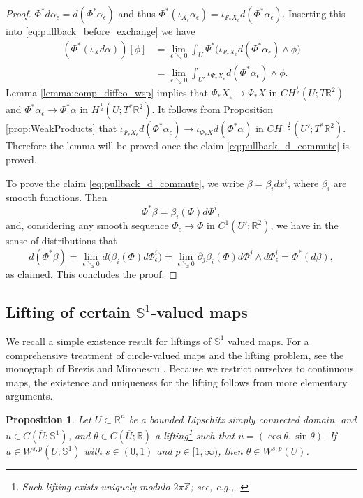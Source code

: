 \documentclass[12pt]{article}
\newcommand{\R}{\mathbb{R}}
\theoremstyle{plain}
\newtheorem{proposition}[theorem]{Proposition}
\numberwithin{equation}{section}
\begin{document}
\begin{proof}
        $\Phi^* d\alpha_\epsilon = d(\Phi^*\alpha_\epsilon)$ and thus $\Phi^*(\iota_{X_\epsilon} \alpha_\epsilon) = \iota_{\Psi_*X_\epsilon} d(\Phi^*\alpha_\epsilon)$. Inserting this into \eqref{eq:pullback_before_exchange} we have
        \begin{align*}
            (\Phi^*(\iota_X d\alpha))[\phi] &= \lim_{\epsilon \searrow 0} \int_U \Psi^* \big( \iota_{\Psi_*X_\epsilon}d(\Phi^*\alpha_\epsilon) \wedge \phi\big)\\
            &= \lim_{\epsilon \searrow 0} \int_{U'} \iota_{\Psi_*X_\epsilon}d(\Phi^*\alpha_\epsilon) \wedge \phi.
        \end{align*}
        Lemma \ref{lemma:comp_diffeo_wsp} implies that $\Psi_*X_\epsilon \to \Psi_*X$ in $CH^\frac12(U;T\R^2)$ and $\Phi^*\alpha_\epsilon \to \Phi^*\alpha$ in $H^\frac12(U;T^*\R^2)$. It follows from Proposition \ref{prop:WeakProducts} that $\iota_{\Psi_*X_\epsilon} d(\Phi^*\alpha_\epsilon) \to \iota_{\Phi_*X} d(\Phi^*\alpha)$ in $CH^{-\frac12}(U';T^*\R^2)$. Therefore the lemma will be proved once the claim \eqref{eq:pullback_d_commute} is proved.
        
        To prove the claim \eqref{eq:pullback_d_commute}, we write $\beta = \beta_i dx^i$, where $\beta_i$ are smooth functions. Then
        \begin{equation*}
            \Phi^*\beta = \beta_i(\Phi)d\Phi^i,
        \end{equation*}
        and, considering any smooth sequence $\Phi_\epsilon \to \Phi$ in $C^1(\overline U';\R^2)$, we have in the sense of distributions that 
        \begin{equation*}
            d(\Phi^*\beta) = \lim_{\epsilon\searrow 0} d\Big(\beta_i(\Phi)d\Phi^i_\epsilon\Big) = \lim_{\epsilon\searrow 0} \partial_j \beta_i(\Phi) d\Phi^j \wedge d\Phi^i_{\epsilon} = \Phi^*(d\beta),
        \end{equation*}
        as claimed. This concludes the proof.
    \end{proof}

\subsection{Lifting of certain $\mathbb{S}^1$-valued maps} \label{sec:lifting}

We recall a simple existence result for liftings of $\mathbb{S}^1$ valued maps. For a comprehensive treatment of circle-valued maps and the lifting problem, see the monograph of Brezis and Mironescu \cite{brezis_mironescu_21}. Because we restrict ourselves to continuous maps, the existence and uniqueness for the lifting follows from more elementary arguments.
\begin{proposition} \label{prop:lifting}
Let $U \subset \R^n$ be a bounded Lipschitz simply connected domain, and $u \in C(\overline{U}; \mathbb{S}^1)$, and $\theta \in C(\overline{U};\R)$ a lifting\footnote{Such lifting exists uniquely modulo $2\pi \mathbb{Z}$; see, e.g., \cite[Lemma 1.1]{brezis_mironescu_21}.} such that $u = (\cos\theta, \sin\theta)$. If $u \in W^{s,p}(U; \mathbb{S}^1)$ with $s \in (0,1)$ and $p \in [1,\infty)$, then $\theta \in W^{s,p}(U)$.
\end{proposition}
\end{document}
